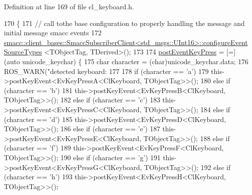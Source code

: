 Definition at line 169 of file cl\+\_\+keyboard.\+h.


\begin{DoxyCode}
170         \{
171                 \textcolor{comment}{// call tothe base configuration to properly handling the message and initial message smacc
       events}
172                 
      \hyperlink{classsmacc_1_1client__bases_1_1SmaccSubscriberClient}{smacc::client\_bases::SmaccSubscriberClient<std\_msgs::UInt16>::configureEventSourceTypes}
      <TObjectTag, TDerived>();
173 
174                 \hyperlink{classcl__keyboard_1_1ClKeyboard_ae9811fd50207ba9b69a4f27e7f8b4e86}{postEventKeyPress} = [=](\textcolor{keyword}{auto} unicode\_keychar) \{
175                         \textcolor{keywordtype}{char} character = (char)unicode\_keychar.data;
176                         ROS\_WARN(\textcolor{stringliteral}{"detected keyboard: %
177 
178                         \textcolor{keywordflow}{if} (character == \textcolor{charliteral}{'a'})
179                                 this->postKeyEvent<EvKeyPressA<ClKeyboard, TObjectTag>>();
180                         \textcolor{keywordflow}{else} \textcolor{keywordflow}{if} (character == \textcolor{charliteral}{'b'})
181                                 this->postKeyEvent<EvKeyPressB<ClKeyboard, TObjectTag>>();
182                         \textcolor{keywordflow}{else} \textcolor{keywordflow}{if} (character == \textcolor{charliteral}{'c'})
183                                 this->postKeyEvent<EvKeyPressC<ClKeyboard, TObjectTag>>();
184                         \textcolor{keywordflow}{else} \textcolor{keywordflow}{if} (character == \textcolor{charliteral}{'d'})
185                                 this->postKeyEvent<EvKeyPressD<ClKeyboard, TObjectTag>>();
186                         \textcolor{keywordflow}{else} \textcolor{keywordflow}{if} (character == \textcolor{charliteral}{'e'})
187                                 this->postKeyEvent<EvKeyPressE<ClKeyboard, TObjectTag>>();
188                         \textcolor{keywordflow}{else} \textcolor{keywordflow}{if} (character == \textcolor{charliteral}{'f'})
189                                 this->postKeyEvent<EvKeyPressF<ClKeyboard, TObjectTag>>();
190                         \textcolor{keywordflow}{else} \textcolor{keywordflow}{if} (character == \textcolor{charliteral}{'g'})
191                                 this->postKeyEvent<EvKeyPressG<ClKeyboard, TObjectTag>>();
192                         \textcolor{keywordflow}{else} \textcolor{keywordflow}{if} (character == \textcolor{charliteral}{'h'})
193                                 this->postKeyEvent<EvKeyPressH<ClKeyboard, TObjectTag>>();
}
\end{DoxyCode}
